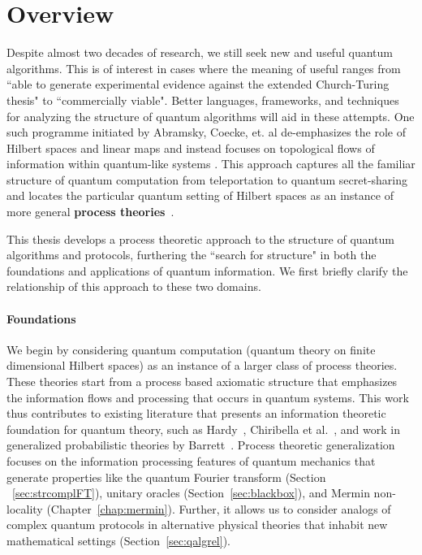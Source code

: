 \chapter{Overview}

Despite almost two decades of research, we still seek new and useful quantum algorithms.  This is of interest in cases where the meaning of useful ranges from ``able to generate experimental evidence against the extended Church-Turing thesis" to ``commercially viable". Better languages, frameworks, and techniques for analyzing the structure of quantum algorithms will aid in these attempts.  One such  programme initiated by Abramsky, Coecke, et. al de-emphasizes the role of Hilbert spaces and linear maps and instead focuses on topological flows of information within quantum-like systems
\cite{abramsky2008categorical,coecke2011interacting,coecke2013new}. This approach captures all the familiar structure of quantum computation from teleportation  to quantum secret-sharing and locates the particular quantum setting of Hilbert spaces as an instance of more general
\textbf{process theories}~\cite{coecke2015generalised,qcs-notes,coecke2011categories}. 

This thesis develops a process theoretic approach to the structure of quantum algorithms and protocols, furthering the ``search for structure" in both the foundations and applications of quantum information. We first briefly clarify the relationship of this approach to these two domains.
 
\subsubsection*{Foundations}

We begin by considering quantum computation (quantum theory on finite dimensional Hilbert spaces) as an instance of a larger class of process theories. These theories start from a process based axiomatic structure that emphasizes the information flows and processing that occurs in quantum systems. This work thus contributes to existing literature that presents an information theoretic foundation for quantum theory, such as Hardy~\cite{hardy2001quantum}, Chiribella et al.~\cite{chiribella2011informational}, and work in generalized probabilistic theories by Barrett~\cite{barrett2007information}.  Process theoretic generalization focuses on the information processing features of quantum mechanics that generate properties like the quantum Fourier transform (Section ~\ref{sec:strcomplFT}), unitary oracles (Section~\ref{sec:blackbox}), and Mermin non-locality (Chapter~\ref{chap:mermin}). Further, it allows us to consider analogs of complex quantum protocols in alternative physical theories that inhabit new mathematical settings (Section~\ref{sec:qalgrel}).

